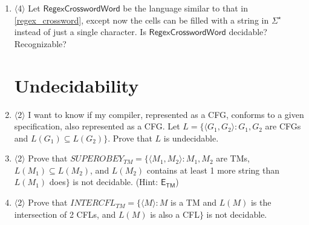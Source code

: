 \documentclass[a4paper,american,12pt]{book}
\newcommand{\Level}[1]{{\color{blue} $\langle$#1$\rangle$}}
\begin{document}
\begin{enumerate}
For example, here is a graphical representation of a possible input with $\Sigma = \{a, b\}$:

\begin{table}[!htbp]
	\centering
	\begin{tabular}{llll}
		\cline{2-4}
		\multicolumn{1}{l|}{$(bba)^\star$} & \multicolumn{1}{l|}{} & \multicolumn{1}{l|}{} & \multicolumn{1}{l|}{} \\ \cline{2-4} 
		\multicolumn{1}{l|}{$b(a^\star b)^\star$} & \multicolumn{1}{l|}{} & \multicolumn{1}{l|}{} & \multicolumn{1}{l|}{} \\ \cline{2-4} 
		&     $(a \cup bb)^\star$                 &       $(ba)^\star ab$                &   $((ba)^\star \cup (ab)^\star)^\star$                
	\end{tabular}
\end{table}

Let the language $\textsf{RegexCrossword}$ be the set of all instances $\langle A, R_1, \cdots, R_m, C_1, \cdots, C_n\rangle$ where $A$ is an $m \times n$ grid, $R_1, \cdots, R_m, C_1, \cdots, C_n$ are regexes, and there is a solution to $A$ as described above. Show that $\textsf{RegexCrossword}$ is decidable. (Hint: brute-force.)

\item \Level{4} Let $\textsf{RegexCrosswordWord}$ be the language similar to that in \cref{regex_crossword}, except now the cells can be filled with a string in $\Sigma^\star$ instead of just a single character. Is $\textsf{RegexCrosswordWord}$ decidable? Recognizable? 

\section{Undecidability}

\item \Level{2} I want to know if my compiler, represented as a CFG, conforms to a given specification, also represented as a CFG. Let $L = \{\langle G_1, G_2 \rangle : G_1, G_2$ are CFGs and $L(G_1) \subseteq L(G_2)\}$. Prove that $L$ is undecidable.

\item \Level{2} Prove that $SUPEROBEY_{TM} = \{ \langle M_1, M_2 \rangle : M_1, M_2$ are TMs, $L(M_1) \subseteq L(M_2)$, and $L(M_2)$ contains at least 1 more string than $L(M_1)$ does$\}$ is not decidable. (Hint: $\mathsf{E}_{\mathsf{TM}}$)

\item \Level{2} Prove that $INTERCFL_{TM} = \{ \langle M \rangle : M$ is a TM and $L(M)$ is the intersection of 2 CFLs, and $L(M)$ is also a CFL$\}$ is not decidable.


\end{enumerate}
\end{document}
